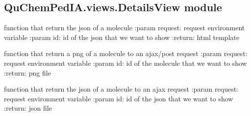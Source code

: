 \documentclass[letterpaper,10pt,english]{sphinxmanual}
\begin{document}
\subsection{QuChemPedIA.views.DetailsView module}
\label{\detokenize{QuChemPedIA.views:module-QuChemPedIA.views.DetailsView}}\label{\detokenize{QuChemPedIA.views:quchempedia-views-detailsview-module}}

\begin{fulllineitems}
\label{\detokenize{QuChemPedIA.views:QuChemPedIA.views.DetailsView.details}}
function that return the json of a molecule
:param request: request environment variable
:param id: id of the json that we want to show
:return: html template

\end{fulllineitems}


\begin{fulllineitems}
\label{\detokenize{QuChemPedIA.views:QuChemPedIA.views.DetailsView.details_image}}
function that return a png of a molecule to an ajax/post request
:param request: request environment variable
:param id: id of the molecule that we want to show
:return: png file

\end{fulllineitems}


\begin{fulllineitems}
\label{\detokenize{QuChemPedIA.views:QuChemPedIA.views.DetailsView.details_json}}
function that return the json of a molecule to an ajax request
:param request: request environment variable
:param id: id of the json that we want to show
:return: json file

\end{fulllineitems}
\end{document}
